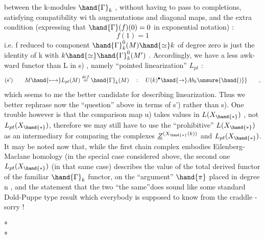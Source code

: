 
between the k-modules $\hand{\Gamma}_k$ ,  without having to pass to completions,
satisfying compatibility wi th augmentations and diagonal maps,  and
the extra condition  (expressing that $\hand{\Gamma}(f)(0) = 0$ \xout{)} in exponential
notation) :
\[ f(1) = 1 \]
i.e. f reduced to component  $\hand{\Gamma}_k^{0}(M)\hand{\simeq} k$  of degree zero is just
the identity of k with  $k\hand{\simeq}\hand{\Gamma}_k^{0}(M')$ .  Accordingly,  we have a less awk-%
ward  functor than L in \hand{(}s) ,  namely ``pointed linearization'' $L_{pt}$ :
\[ \text{(s')} \qquad M\hand{\longmapsto} L_{pt}(M)\overset{def}{=}\hand{\Gamma}_k(M) \quad : \quad U(k)^{\bullet}\hand{\to} Ab_k \unsure{\hand{)}} \qquad , \]
 which seems to me the better candidate for describing linearization.
Thus we better rephrase now the ``question'' above in terms of \hand{(}s') rather
than \hand{(}s).  One trouble however is that the comparison map \hand{(}u)  takes 
values in $L(X_{\hand{*}})$ ,  not $L_{pt}(X_{\hand{*}})$,  therefore we may still have to use
the ``prohibitive'' $L(X_{\hand{*}})$  as an intermediary for comparing  the complexes
$\underline{Z}^{(X_{\hand{*}}(k))}$  and $L_{pt}(X_{\hand{*}})$.  It may be noted now that,  while the first chain
 complex embodies  Eilenberg-Maclane homology   (in the special case
considered above\hand{)}, the second one  $L_{pt}(X_{\hand{*}})$  (in that same case) describes
the value of the total derived functor of the familiar $\hand{\Gamma}_k$ functor,  on
the ``argument'' $\hand{\pi}$ placed in degree n ,  and the statement that the two
``the same''does sound like some standard Dold-Puppe type result
which everybody is supposed to know from the craddle  - sorry !

\begin{center}
* \qquad *\\
*
\end{center}


